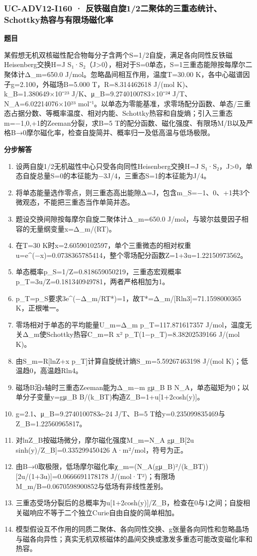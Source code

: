 \documentclass[UTF8,11pt,a4paper]{ctexart}
\begin{document}
\subsubsection*{UC-ADV12-I160 · 反铁磁自旋1/2二聚体的三重态统计、Schottky热容与有限场磁化率}
\noindent\textbf{题目}\par
某假想无机双核磁性配合物每分子含两个S=1/2自旋，满足各向同性反铁磁Heisenberg交换H=J S₁·S₂（J>0），相对于S=0单态，S=1三重态能隙按每摩尔二聚体计Δ\_m=650.0 J/mol。忽略晶间相互作用，温度T=30.00 K，各中心磁谱因子g=2.100，外磁场B=5.000 T，R=8.314462618 J/(mol K)、k\_B=1.380649×10⁻²³ J/K、μ\_B=9.2740100783×10⁻²⁴ J/T、N\_A=6.02214076×10²³ mol⁻¹。以单态为零能基准，求零场配分函数、单态/三重态占据分数、等概率温度、相对内能、Schottky热容和自旋熵；引入三重态m=−1,0,+1的Zeeman分裂，求B=5 T的配分函数、磁化强度、有限场M/B以及严格B→0摩尔磁化率，检查自旋简并、概率归一及低高温与低场极限。\par
\medskip\noindent\textbf{分步解答}
\begin{enumerate}
\item 设两自旋1/2无机磁性中心只受各向同性Heisenberg交换H=J S₁·S₂，J>0，单态自旋总量S=0的本征能为−3J/4，三重态S=1的本征能为J/4。
\item 将单态能量选作零点，则三重态高出能隙Δ=J，包含m\_S=−1、0、+1共3个微观态，不能把三重态当作单简并态。
\item 题设交换间隙按每摩尔自旋二聚体计Δ\_m=650.0 J/mol，与玻尔兹曼因子相容的无量纲变量x=Δ\_m/(RT)。
\item 在T=30 K时x=2.60590102597，单个三重微态的相对权重u=e\textasciicircum{}(−x)=0.0738365785414，整个零场配分函数Z=1+3u=1.22150973562。
\item 单态概率p\_S=1/Z=0.818659050219，三重态宏观概率p\_T=3u/Z=0.181340949781，两者严格相加为1。
\item p\_T=p\_S要求3e\textasciicircum{}(−Δ\_m/RT*)=1，故T*=Δ\_m/[Rln3]=71.1598000365 K，正根唯一。
\item 零场相对于单态的平均能量U\_m=Δ\_m p\_T=117.871617357 J/mol，温度无关Δ\_m使Schottky热容C\_m=R x² p\_T(1−p\_T)=8.38202539166 J/(mol K)。
\item 由S\_m=R[lnZ+x p\_T]计算自旋统计熵S\_m=5.59267463198 J/(mol K)；低温趋0，高温趋Rln4。
\item 磁场B沿z轴时三重态Zeeman能为Δ\_m−m gμ\_B B N\_A，单态磁矩为0；以单分子变量y=gμ\_B B/(k\_BT)构造Z\_B=1+u[1+2cosh(y)]。
\item g=2.1、μ\_B=9.2740100783e-24 J/T、B=5 T给y=0.235099835469与Z\_B=1.22560965817。
\item 对lnZ\_B按磁场微分，摩尔磁化强度M\_m=N\_A gμ\_B[2u sinh(y)/Z\_B]=0.335299450426 A·m²/mol，符号为正。
\item 由B→0取极限，低场摩尔磁化率χ\_m=(N\_A(gμ\_B)²/(k\_BT))[2u/(1+3u)]=0.0666691178178 J/(mol·T²)；有限场M\_m/B=0.0670598900852与低场有非线性差别。
\item 三重态受场分裂后的总概率为u[1+2cosh(y)]/Z\_B，检查在0与1之间；自旋相关磁响应不等于二个独立Curie自由自旋的简单相加。
\item 模型假设互不作用的同质二聚体、各向同性交换、g张量各向同性和忽略晶场与磁各向异性；真实无机双核磁体的晶间交换或激发多重态可能改变磁化率和热容。
\end{enumerate}
\end{document}
